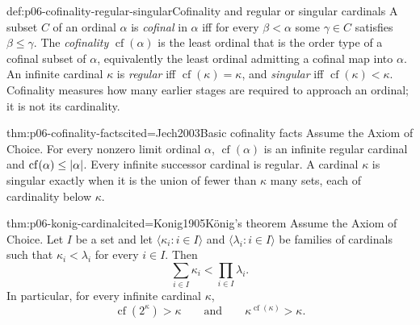 \begin{hbdefinition}{def:p06-cofinality-regular-singular}{Cofinality and regular or singular cardinals}
A subset \(C\) of an ordinal \(\alpha\) is \emph{cofinal} in \(\alpha\) iff
for every \(\beta<\alpha\) some \(\gamma\in C\) satisfies
\(\beta\leq\gamma\).  The \emph{cofinality} \(\operatorname{cf}(\alpha)\)
is the least ordinal that is the order type of a cofinal subset of \(\alpha\),
equivalently the least ordinal admitting a cofinal map into \(\alpha\).
An infinite cardinal \(\kappa\) is \emph{regular} iff
\(\operatorname{cf}(\kappa)=\kappa\), and \emph{singular} iff
\(\operatorname{cf}(\kappa)<\kappa\).  Cofinality measures how many earlier
stages are required to approach an ordinal; it is not its cardinality.
\end{hbdefinition}

\begin{hbtheorem}{thm:p06-cofinality-facts}{cited=Jech2003}{Basic cofinality facts}
Assume the Axiom of Choice.  For every nonzero limit ordinal \(\alpha\),
\(\operatorname{cf}(\alpha)\) is an infinite regular cardinal and
\(\operatorname{cf}(\alpha)\leq\lvert\alpha\rvert\).  Every infinite successor
cardinal is regular.  A cardinal \(\kappa\) is singular exactly when it is the
union of fewer than \(\kappa\) many sets, each of cardinality below
\(\kappa\).
\end{hbtheorem}

\begin{hbtheorem}{thm:p06-konig-cardinal}{cited=Konig1905}{K\"onig's theorem}
Assume the Axiom of Choice.  Let \(I\) be a set and let
\(\langle\kappa_i:i\in I\rangle\) and
\(\langle\lambda_i:i\in I\rangle\) be families of cardinals such that
\(\kappa_i<\lambda_i\) for every \(i\in I\).  Then
\[
  \sum_{i\in I}\kappa_i
  <
  \prod_{i\in I}\lambda_i.
\]
In particular, for every infinite cardinal \(\kappa\),
\[
  \operatorname{cf}(2^\kappa)>\kappa
  \qquad\text{and}\qquad
  \kappa^{\operatorname{cf}(\kappa)}>\kappa.
\]
\end{hbtheorem}


